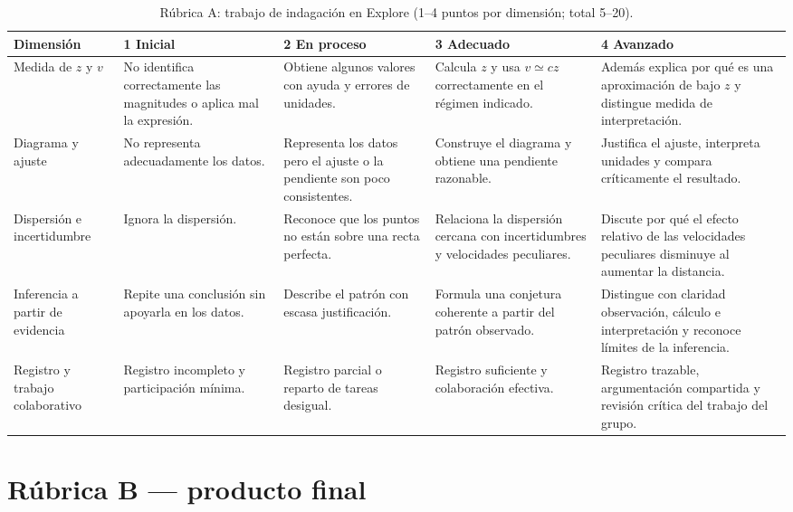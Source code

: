 \begin{table}[htbp]
\centering
\caption{Rúbrica A: trabajo de indagación en Explore (1--4 puntos por dimensión; total 5--20).}\label{tab:rubricaA}
\begin{tabularx}{\textwidth}{|p{2.4cm}|X|X|X|X|}
\hline
\rowcolor{naranja}
\color{white}\textbf{Dimensión} & \color{white}\textbf{1 Inicial} & \color{white}\textbf{2 En proceso} & \color{white}\textbf{3 Adecuado} & \color{white}\textbf{4 Avanzado} \\ \hline
Medida de $z$ y $v$ & No identifica correctamente las magnitudes o aplica mal la expresión. & Obtiene algunos valores con ayuda y errores de unidades. & Calcula $z$ y usa $v\simeq cz$ correctamente en el régimen indicado. & Además explica por qué es una aproximación de bajo $z$ y distingue medida de interpretación. \\ \hline
Diagrama y ajuste & No representa adecuadamente los datos. & Representa los datos pero el ajuste o la pendiente son poco consistentes. & Construye el diagrama y obtiene una pendiente razonable. & Justifica el ajuste, interpreta unidades y compara críticamente el resultado. \\ \hline
Dispersión e incertidumbre & Ignora la dispersión. & Reconoce que los puntos no están sobre una recta perfecta. & Relaciona la dispersión cercana con incertidumbres y velocidades peculiares. & Discute por qué el efecto relativo de las velocidades peculiares disminuye al aumentar la distancia. \\ \hline
Inferencia a partir de evidencia & Repite una conclusión sin apoyarla en los datos. & Describe el patrón con escasa justificación. & Formula una conjetura coherente a partir del patrón observado. & Distingue con claridad observación, cálculo e interpretación y reconoce límites de la inferencia. \\ \hline
Registro y trabajo colaborativo & Registro incompleto y participación mínima. & Registro parcial o reparto de tareas desigual. & Registro suficiente y colaboración efectiva. & Registro trazable, argumentación compartida y revisión crítica del trabajo del grupo. \\ \hline
\end{tabularx}
\end{table}

\clearpage
\section*{Rúbrica B --- producto final}\label{sec:rubricaB}

